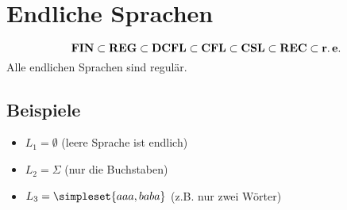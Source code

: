 \chapter{Endliche Sprachen}
\begin{equation*}
	\operatorname{\mathbf{FIN}}\subset\operatorname{\mathbf{REG}}\subset\operatorname{\mathbf{DCFL}}\subset\operatorname{\mathbf{CFL}}\subset\operatorname{\mathbf{CSL}}\subset\operatorname{\mathbf{REC}}\subset\operatorname{\mathbf{r.e.}}
\end{equation*}
Alle endlichen Sprachen sind regulär.

\section{Beispiele}
\begin{itemize}
	\item $L_1=\emptyset$ (leere Sprache ist endlich)
	\item $L_2=\Sigma$ (nur die Buchstaben)
	\item $L_3=\simpleset{aaa,baba}$ (z.B. nur zwei Wörter)
\end{itemize}

